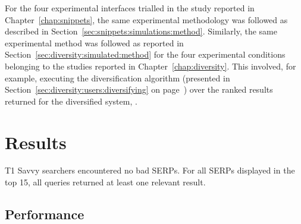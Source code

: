 For the four experimental interfaces trialled in the study reported in Chapter~\ref{chap:snippets}, the same experimental methodology was followed as described in Section~\ref{sec:snippets:simulations:method}. Similarly, the same experimental method was followed as reported in Section~\ref{sec:diversity:simulated:method} for the four experimental conditions belonging to the studies reported in Chapter~\ref{chap:diversity}. This involved, for example, executing the diversification algorithm (presented in Section~\ref{sec:diversity:users:diversifying} on page~\pageref{sec:diversity:users:diversifying}) over the ranked results returned for the diversified system, .

\section{Results}


T1 Savvy searchers encountered no bad SERPs. For all SERPs displayed in the top 15, all queries returned at least one relevant result.

\subsection{Performance}

